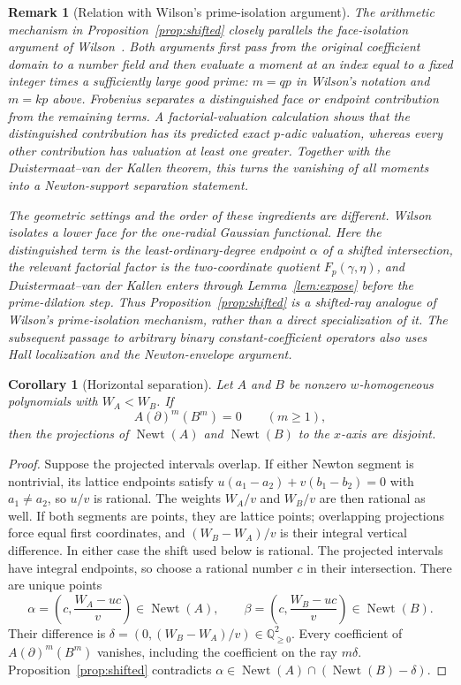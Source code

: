 \documentclass[11pt]{article}
\newtheorem{corollary}[theorem]{Corollary}
\newtheorem{remark}[theorem]{Remark}
\newcommand{\Q}{\mathbb Q}
\newcommand{\Newt}{\operatorname{Newt}}
\begin{document}
\begin{remark}[Relation with Wilson's prime-isolation argument]
The arithmetic mechanism in Proposition~\ref{prop:shifted} closely parallels
the face-isolation argument of Wilson~\cite{WilsonGMC}.  Both arguments
first pass from the original coefficient domain to a number field and then
evaluate a moment at an index equal to a fixed integer times a sufficiently
large good prime: $m=qp$ in Wilson's notation and $m=kp$ above.
Frobenius separates a distinguished face or endpoint contribution from the
remaining terms.  A factorial-valuation calculation shows that the
distinguished contribution has its predicted exact $p$-adic valuation,
whereas every other contribution has valuation at least one greater.
Together with the Duistermaat--van der Kallen theorem, this turns the
vanishing of all moments into a Newton-support separation statement.

The geometric settings and the order of these ingredients are different.
Wilson isolates a lower face for the one-radial Gaussian functional.  Here
the distinguished term is the least-ordinary-degree endpoint $\alpha$ of a
shifted intersection, the relevant factorial factor is the two-coordinate
quotient $F_p(\gamma,\eta)$, and Duistermaat--van der Kallen enters through
Lemma~\ref{lem:expose} before the prime-dilation step.  Thus
Proposition~\ref{prop:shifted} is a shifted-ray analogue of Wilson's
prime-isolation mechanism, rather than a direct specialization of it.
The subsequent passage to arbitrary binary constant-coefficient operators
also uses Hall localization and the Newton-envelope argument.
\end{remark}

\begin{corollary}[Horizontal separation]\label{cor:horizontal}
Let $A$ and $B$ be nonzero $w$-homogeneous polynomials with
$W_A<W_B$.  If
\[
 A(\partial)^m(B^m)=0\qquad(m\geq1),
\]
then the projections of $\Newt(A)$ and $\Newt(B)$ to the $x$-axis are
disjoint.
\end{corollary}

\begin{proof}
Suppose the projected intervals overlap.  If either Newton segment is
nontrivial, its lattice endpoints satisfy
$u(a_1-a_2)+v(b_1-b_2)=0$ with $a_1\ne a_2$, so $u/v$ is rational.
The weights $W_A/v$ and $W_B/v$ are then rational as well.
If both segments are points, they are lattice points; overlapping
projections force equal first coordinates, and $(W_B-W_A)/v$ is their
integral vertical difference.  In either case the shift used below is
rational.  The projected intervals have integral endpoints, so choose a
rational number $c$ in their intersection.  There are unique points
\[
 \alpha=\left(c,\frac{W_A-uc}{v}\right)\in\Newt(A),
 \qquad
 \beta=\left(c,\frac{W_B-uc}{v}\right)\in\Newt(B).
\]
Their difference is
$\delta=(0,(W_B-W_A)/v)\in\Q_{\geq0}^2$.  Every coefficient of
$A(\partial)^m(B^m)$ vanishes, including the coefficient on the ray
$m\delta$.  Proposition~\ref{prop:shifted} contradicts
$\alpha\in\Newt(A)\cap(\Newt(B)-\delta)$.
\end{proof}
\end{document}
